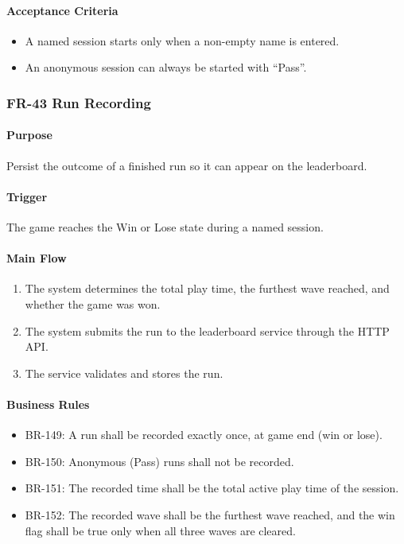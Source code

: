 \documentclass[11pt,a4paper]{article}
\begin{document}
\paragraph{Acceptance Criteria}
\begin{itemize}
  \item A named session starts only when a non-empty name is entered.
  \item An anonymous session can always be started with ``Pass''.
\end{itemize}

\subsubsection{FR-43 Run Recording}

\paragraph{Purpose}
Persist the outcome of a finished run so it can appear on the leaderboard.

\paragraph{Trigger}
The game reaches the Win or Lose state during a named session.

\paragraph{Main Flow}
\begin{enumerate}
  \item The system determines the total play time, the furthest wave reached, and
        whether the game was won.
  \item The system submits the run to the leaderboard service through the HTTP
        API.
  \item The service validates and stores the run.
\end{enumerate}

\paragraph{Business Rules}
\begin{itemize}
  \item BR-149: A run shall be recorded exactly once, at game end (win or lose).
  \item BR-150: Anonymous (Pass) runs shall not be recorded.
  \item BR-151: The recorded time shall be the total active play time of the
        session.
  \item BR-152: The recorded wave shall be the furthest wave reached, and the win
        flag shall be true only when all three waves are cleared.
\end{itemize}
\end{document}
